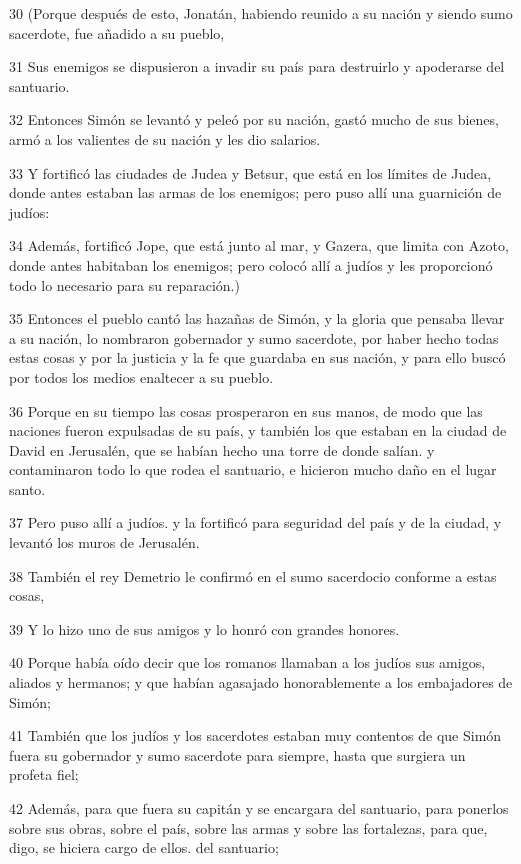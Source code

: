 \par 30 (Porque después de esto, Jonatán, habiendo reunido a su nación y siendo sumo sacerdote, fue añadido a su pueblo,
\par 31 Sus enemigos se dispusieron a invadir su país para destruirlo y apoderarse del santuario.
\par 32 Entonces Simón se levantó y peleó por su nación, gastó mucho de sus bienes, armó a los valientes de su nación y les dio salarios.
\par 33 Y fortificó las ciudades de Judea y Betsur, que está en los límites de Judea, donde antes estaban las armas de los enemigos; pero puso allí una guarnición de judíos:
\par 34 Además, fortificó Jope, que está junto al mar, y Gazera, que limita con Azoto, donde antes habitaban los enemigos; pero colocó allí a judíos y les proporcionó todo lo necesario para su reparación.)
\par 35 Entonces el pueblo cantó las hazañas de Simón, y la gloria que pensaba llevar a su nación, lo nombraron gobernador y sumo sacerdote, por haber hecho todas estas cosas y por la justicia y la fe que guardaba en sus nación, y para ello buscó por todos los medios enaltecer a su pueblo.
\par 36 Porque en su tiempo las cosas prosperaron en sus manos, de modo que las naciones fueron expulsadas de su país, y también los que estaban en la ciudad de David en Jerusalén, que se habían hecho una torre de donde salían. y contaminaron todo lo que rodea el santuario, e hicieron mucho daño en el lugar santo.
\par 37 Pero puso allí a judíos. y la fortificó para seguridad del país y de la ciudad, y levantó los muros de Jerusalén.
\par 38 También el rey Demetrio le confirmó en el sumo sacerdocio conforme a estas cosas,
\par 39 Y lo hizo uno de sus amigos y lo honró con grandes honores.
\par 40 Porque había oído decir que los romanos llamaban a los judíos sus amigos, aliados y hermanos; y que habían agasajado honorablemente a los embajadores de Simón;
\par 41 También que los judíos y los sacerdotes estaban muy contentos de que Simón fuera su gobernador y sumo sacerdote para siempre, hasta que surgiera un profeta fiel;
\par 42 Además, para que fuera su capitán y se encargara del santuario, para ponerlos sobre sus obras, sobre el país, sobre las armas y sobre las fortalezas, para que, digo, se hiciera cargo de ellos. del santuario;
